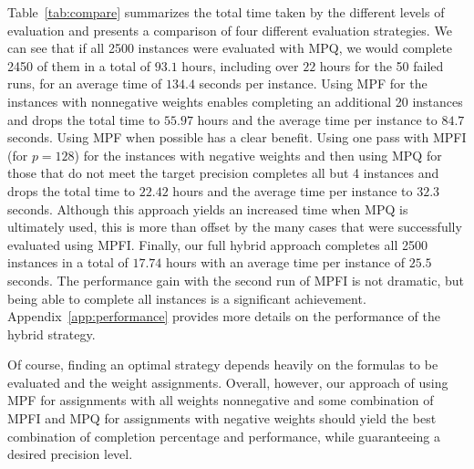 \documentclass[letterpaper,USenglish,cleveref, autoref, thm-restate]{lipics-v2021}
\begin{document}
\begin{table}
  \caption{Performance Comparison of Different Implementation Strategies.  Run entries of the form $S$+$F$ indicate that $S$ runs
  were successful and $F$ runs either ran out of memory or failed to meet the target precision.}
  \label{tab:compare}
\end{table}

Table~\ref{tab:compare} summarizes the total time taken by the
different levels of evaluation and presents a comparison of four
different evaluation strategies.  We can see that if all 2500
instances were evaluated with MPQ, we would complete 2450 of them in a
total of $93.1$ hours, including over $22$ hours for the 50 failed runs, for an average time of $134.4$ seconds per
instance.  Using MPF for the instances with nonnegative weights
enables completing an additional 20 instances and drops the total
time to $55.97$ hours and  the average time per instance to $84.7$ seconds.
Using MPF when possible has a clear benefit.  Using one pass with MPFI
(for $p=128$) for the instances with negative weights and then using
MPQ for those that do not meet the target precision completes all
but 4 instances and drops the total time to $22.42$ hours and the
average time per instance to $32.3$ seconds.  Although this approach yields
an increased time when MPQ is ultimately used, this is more than
offset by the many cases that were successfully evaluated using
MPFI\@.  Finally, our full hybrid approach completes all 2500
instances in a total of $17.74$ hours with an average time per instance of
$25.5$ seconds.  The performance gain with the second run of MPFI is
not dramatic, but being able to complete all instances is a significant
achievement.
Appendix~\ref{app:performance} provides more details on the performance of the hybrid strategy.

Of course, finding an optimal strategy depends heavily on the formulas
to be evaluated and the weight assignments.  Overall, however, our
approach of using MPF for assignments with all weights nonnegative and
some combination of MPFI and MPQ for assignments with negative weights
should yield the best combination of completion percentage and
performance, while guaranteeing a desired precision level.
\end{document}
